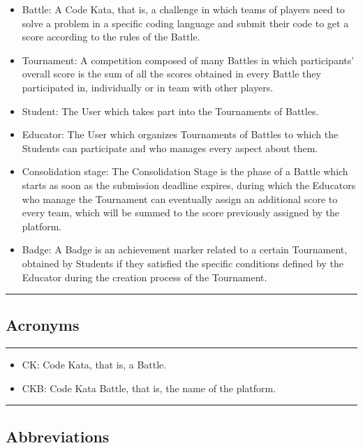 \documentclass{Configuration_Files/Template}
\begin{document}
\begin{itemize}
\item \textcolor{bluepoli}{Battle:} A Code Kata, that is, a challenge in which teams of players need to solve a problem in a specific coding language and submit their code to get a score according to the rules of the Battle.
\item \textcolor{bluepoli}{Tournament:} A competition composed of many Battles in which participants' overall score is the sum of all the scores obtained in every Battle they participated in, individually or in team with other players.
\item \textcolor{bluepoli}{Student:} The User which takes part into the Tournaments of Battles.
\item \textcolor{bluepoli}{Educator:} The User which organizes Tournaments of Battles to which the Students can participate and who manages every aspect about them.
\item \textcolor{bluepoli}{Consolidation stage:} The Consolidation Stage is the phase of a Battle which starts as soon as the submission deadline expires, during which the Educators who manage the Tournament can eventually assign an additional score to every team, which will be summed to the score previously assigned by the platform.
\item \textcolor{bluepoli}{Badge:} A Badge is an achievement marker related to a certain Tournament, obtained by Students if they satisfied the specific conditions defined by the Educator during the creation process of the Tournament.
\end{itemize}

{\color{bluepoli}\rule{\linewidth}{0.1pt}}

\subsection{Acronyms}

{\color{bluepoli}\rule{\linewidth}{0.1pt}}

\begin{itemize}
\item \textcolor{bluepoli}{CK:} Code Kata, that is, a Battle.
\item \textcolor{bluepoli}{CKB:} Code Kata Battle, that is, the name of the platform.
\end{itemize}

{\color{bluepoli}\rule{\linewidth}{0.1pt}}

\subsection{Abbreviations}
\end{document}
